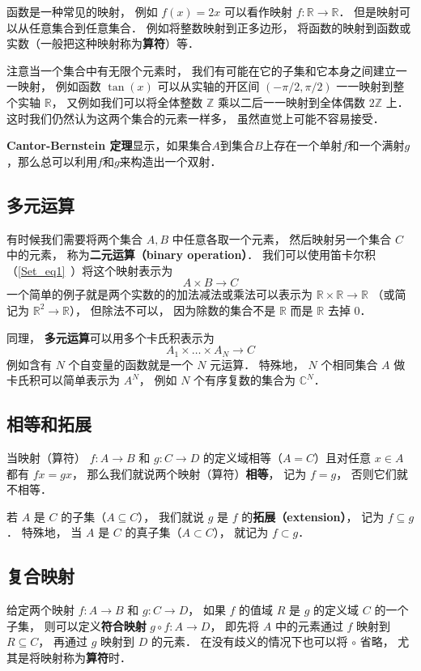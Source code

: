 函数是一种常见的映射， 例如 $f(x) = 2x$ 可以看作映射 $f: \mathbb R \to \mathbb R$． 但是映射可以从任意集合到任意集合． 例如将整数映射到正多边形， 将函数的映射到函数或实数（一般把这种映射称为\textbf{算符}）等．

注意当一个集合中有无限个元素时， 我们有可能在它的子集和它本身之间建立一一映射， 例如函数 $\tan(x)$ 可以从实轴的开区间 $(-\pi/2, \pi/2)$ 一一映射到整个实轴 $\mathbb R$， 又例如我们可以将全体整数 $\mathbb Z$ 乘以二后一一映射到全体偶数 $2\mathbb Z$ 上． 这时我们仍然认为这两个集合的元素一样多， 虽然直觉上可能不容易接受．

\textbf{Cantor-Bernstein 定理}显示，如果集合$A$到集合$B$上存在一个单射$f$和一个满射$g$，那么总可以利用$f$和$g$来构造出一个双射．

\subsection{多元运算}
有时候我们需要将两个集合 $A, B$ 中任意各取一个元素， 然后映射另一个集合 $C$ 中的元素， 称为\textbf{二元运算（binary operation）}． 我们可以使用笛卡尔积（\autoref{Set_eq1}~）将这个映射表示为
\begin{equation}\label{map_eq1}
A \times B \to C
\end{equation}
一个简单的例子就是两个实数的的加法减法或乘法可以表示为 $\mathbb R \times \mathbb R \to \mathbb R$ （或简记为 $\mathbb R^2 \to \mathbb R$）， 但除法不可以， 因为除数的集合不是 $\mathbb R$ 而是 $\mathbb R$ 去掉 $0$．

同理， \textbf{多元运算}可以用多个卡氏积表示为
\begin{equation}
A_1 \times \dots \times A_N \to C
\end{equation}
例如含有 $N$ 个自变量的函数就是一个 $N$ 元运算． 特殊地， $N$ 个相同集合 $A$ 做卡氏积可以简单表示为 $A^N$， 例如 $N$ 个有序复数的集合为 $\mathbb C^N$．

\subsection{相等和拓展}
当映射（算符） $f:A\to B$ 和 $g:C\to D$ 的定义域相等（$A = C$）且对任意 $x\in A$ 都有 $fx = gx$， 那么我们就说两个映射（算符）\textbf{相等}， 记为 $f = g$， 否则它们就不相等．

若 $A$ 是 $C$ 的子集（$A\subseteq C$）， 我们就说 $g$ 是 $f$ 的\textbf{拓展（extension）}， 记为 $f \subseteq g$． 特殊地， 当 $A$ 是 $C$ 的真子集（$A\subset C$）， 就记为 $f \subset g$．

\subsection{复合映射}
给定两个映射 $f:A\to B$ 和 $g:C\to D$， 如果 $f$ 的值域 $R$ 是 $g$ 的定义域 $C$ 的一个子集， 则可以定义\textbf{符合映射} $g\circ f: A\to D$， 即先将 $A$ 中的元素通过 $f$ 映射到 $R \subseteq C$， 再通过 $g$ 映射到 $D$ 的元素． 在没有歧义的情况下也可以将 $\circ$ 省略， 尤其是将映射称为\textbf{算符}时．

